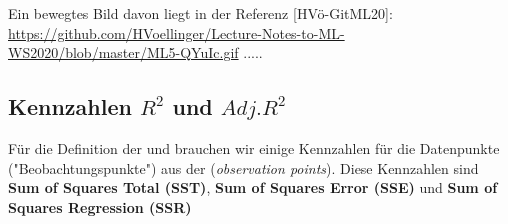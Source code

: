 \documentclass[12pt]{article}
\begin{document}
Ein bewegtes Bild davon liegt in der Referenz [HVö-GitML20]: 
\url{https://github.com/HVoellinger/Lecture-Notes-to-ML-WS2020/blob/master/ML5-QYuIc.gif}
.....\\


\subsection{Kennzahlen $ R^2 $ und $ Adj.R^2 $ }
%
Für die Definition der \textbf{{\color{blue}{simple Linear Regression (sLR)}}} und \textbf{\color{blue}{multiple Linear Regression (mLR)}}  brauchen wir einige Kennzahlen für die Datenpunkte ("Beobachtungspunkte") aus der {\color{blue}{Trainingsmenge}}  (\textit{observation points}).
Diese Kennzahlen sind \textbf{Sum of Squares Total (SST)},\textbf{ Sum of Squares Error (SSE)} und \textbf{Sum of Squares Regression (SSR)}
%
\end{document}
